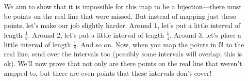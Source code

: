 \documentclass[11pt,twoside=off,numbers=noenddot]{scrbook}
\begin{document}
\begin{proofsketch}
    We aim to show that it is impossible for this map to be a bijection---there must be points on the real line that were missed. But instead of mapping just these points, let's make our job slightly harder. Around 1, let's put a little interval of length $\frac{1}{2}$. Around 2, let's put a little interval of length $\frac{1}{4}$. Around 3, let's place a little interval of length $\frac{1}{8}$. And so on. Now, when you map the points in $\mathbb N$ to the real line, send over the intervals too (possibly some intervals will overlap; this is ok). We'll now prove that not only are there points on the real line that weren't mapped to, but there are even points that these intervals don't cover!
    \begin{figure}[h]
        \centering
        \usetikzlibrary{arrows.meta, positioning, fit, backgrounds, shadows}
\end{figure}
\end{proofsketch}
\end{document}
